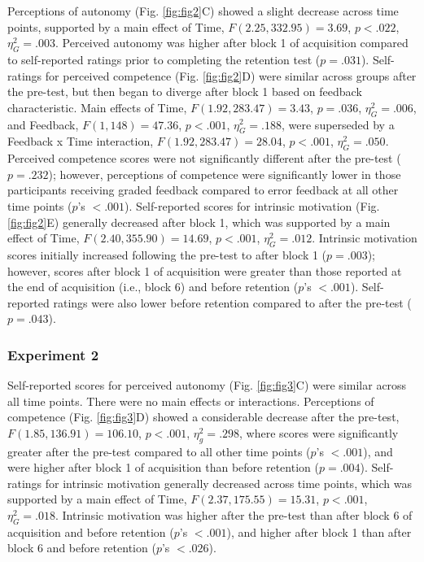 \documentclass[
  doc, donotrepeattitle,floatsintext]{apa7}
\begin{document}
Perceptions of autonomy (Fig. \ref{fig:fig2}C) showed a slight decrease across time points, supported by a main effect of Time, \(F(2.25,332.95) = 3.69\), \(p < .022\), \(\eta_{G}^2 = .003\). Perceived autonomy was higher after block 1 of acquisition compared to self-reported ratings prior to completing the retention test (\(p = .031\)). Self-ratings for perceived competence (Fig. \ref{fig:fig2}D) were similar across groups after the pre-test, but then began to diverge after block 1 based on feedback characteristic. Main effects of Time, \(F(1.92, 283.47) = 3.43\), \(p = .036\), \(\eta_{G}^2 = .006\), and Feedback, \(F(1,148) = 47.36\), \(p < .001\), \(\eta_{G}^2 = .188\), were superseded by a Feedback x Time interaction, \(F(1.92, 283.47) = 28.04\), \(p < .001\), \(\eta_{G}^2 = .050\). Perceived competence scores were not significantly different after the pre-test (\(p = .232\)); however, perceptions of competence were significantly lower in those participants receiving graded feedback compared to error feedback at all other time points (\(p\)'s \(< .001\)). Self-reported scores for intrinsic motivation (Fig. \ref{fig:fig2}E) generally decreased after block 1, which was supported by a main effect of Time, \(F(2.40,355.90) = 14.69\), \(p < .001\), \(\eta_{G}^2 = .012\). Intrinsic motivation scores initially increased following the pre-test to after block 1 (\(p = .003\)); however, scores after block 1 of acquisition were greater than those reported at the end of acquisition (i.e., block 6) and before retention (\(p\)'s \(< .001\)). Self-reported ratings were also lower before retention compared to after the pre-test (\(p = .043\)).

\hypertarget{experiment-2-4}{%
\subsubsection{Experiment 2}\label{experiment-2-4}}

Self-reported scores for perceived autonomy (Fig. \ref{fig:fig3}C) were similar across all time points. There were no main effects or interactions. Perceptions of competence (Fig. \ref{fig:fig3}D) showed a considerable decrease after the pre-test, \(F(1.85,136.91) = 106.10\), \(p < .001\), \(\eta_{g}^2 = .298\), where scores were significantly greater after the pre-test compared to all other time points (\(p\)'s \(< .001\)), and were higher after block 1 of acquisition than before retention (\(p = .004\)). Self-ratings for intrinsic motivation generally decreased across time points, which was supported by a main effect of Time, \(F(2.37,175.55) = 15.31\), \(p < .001\), \(\eta_{G}^2 = .018\). Intrinsic motivation was higher after the pre-test than after block 6 of acquisition and before retention (\(p\)'s \(< .001\)), and higher after block 1 than after block 6 and before retention (\(p\)'s \(< .026\)).
\end{document}
